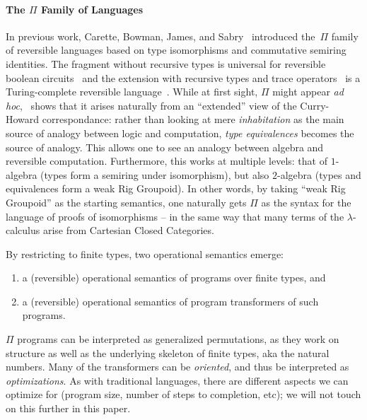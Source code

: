 \documentclass{entcs}
\newcommand{\jacques}[1]{\fbox{\begin{minipage}{0.8\textwidth}\color{red}{Jacques says: {#1}}\end{minipage}}}
\begin{document}
\paragraph*{The $\Pi$ Family of Languages}
\noindent In previous work, Carette, Bowman, James, and
Sabry~\cite{rc2011,James:2012:IE:2103656.2103667,Carette2016} introduced
the~$\Pi$ family of reversible languages based on type isomorphisms and
commutative semiring identities. The fragment without recursive types is
universal for reversible boolean circuits~\cite{James:2012:IE:2103656.2103667}
and the extension with recursive types and trace
operators~\cite{Hasegawa:1997:RCS:645893.671607} is a Turing-complete reversible
language~\cite{James:2012:IE:2103656.2103667,rc2011}. While at first sight,
$\Pi$ might appear \emph{ad hoc},~\cite{Carette2016} shows that it arises
naturally from an ``extended'' view of the Curry-Howard correspondance: rather
than looking at mere \emph{inhabitation} as the main source of analogy between
logic and computation, \emph{type equivalences} becomes the source of analogy.
This allows one to see an analogy between algebra and reversible computation.
Furthermore, this works at multiple levels: that of $1$-algebra (types form a
semiring under isomorphism), but also $2$-algebra (types and equivalences form a
weak Rig Groupoid).  In other words, by taking ``weak Rig Groupoid'' as the
starting semantics, one naturally gets $\Pi$ as the syntax for the language of
proofs of isomorphisms -- in the same way that many terms of the
$\lambda$-calculus arise from Cartesian Closed Categories.

By restricting to finite types, two operational semantics emerge:
\begin{enumerate}
\item a (reversible) operational semantics of programs over finite types, and
\item a (reversible) operational semantics of program transformers of such programs.
\end{enumerate}
$\Pi$ programs can be interpreted as generalized permutations, as they work on
structure as well as the underlying skeleton of finite types, aka the natural numbers.
Many of the transformers can be \emph{oriented}, and thus be interpreted as
\emph{optimizations}.  As with traditional languages, there are different aspects
we can optimize for (program size, number of steps to completion, etc); we will
not touch on this further in this paper.

\end{document}
